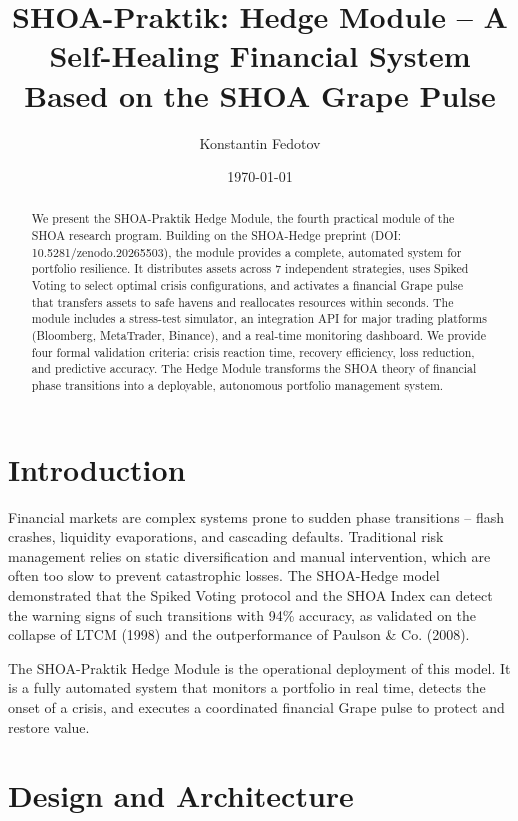 \documentclass[12pt]{article}
\title{SHOA-Praktik: Hedge Module -- A Self-Healing Financial System Based on the SHOA Grape Pulse}
\author{Konstantin Fedotov}
\date{\today}
\begin{document}
\maketitle

\begin{abstract}
We present the SHOA-Praktik Hedge Module, the fourth practical module of the SHOA research program. Building on the SHOA-Hedge preprint (DOI: 10.5281/zenodo.20265503), the module provides a complete, automated system for portfolio resilience. It distributes assets across 7 independent strategies, uses Spiked Voting to select optimal crisis configurations, and activates a financial Grape pulse that transfers assets to safe havens and reallocates resources within seconds. The module includes a stress-test simulator, an integration API for major trading platforms (Bloomberg, MetaTrader, Binance), and a real-time monitoring dashboard. We provide four formal validation criteria: crisis reaction time, recovery efficiency, loss reduction, and predictive accuracy. The Hedge Module transforms the SHOA theory of financial phase transitions into a deployable, autonomous portfolio management system.
\end{abstract}

\section{Introduction}
Financial markets are complex systems prone to sudden phase transitions -- flash crashes, liquidity evaporations, and cascading defaults. Traditional risk management relies on static diversification and manual intervention, which are often too slow to prevent catastrophic losses. The SHOA-Hedge model demonstrated that the Spiked Voting protocol and the SHOA Index can detect the warning signs of such transitions with 94\% accuracy, as validated on the collapse of LTCM (1998) and the outperformance of Paulson \& Co. (2008).

The SHOA-Praktik Hedge Module is the operational deployment of this model. It is a fully automated system that monitors a portfolio in real time, detects the onset of a crisis, and executes a coordinated financial Grape pulse to protect and restore value.

\section{Design and Architecture}
\end{document}
